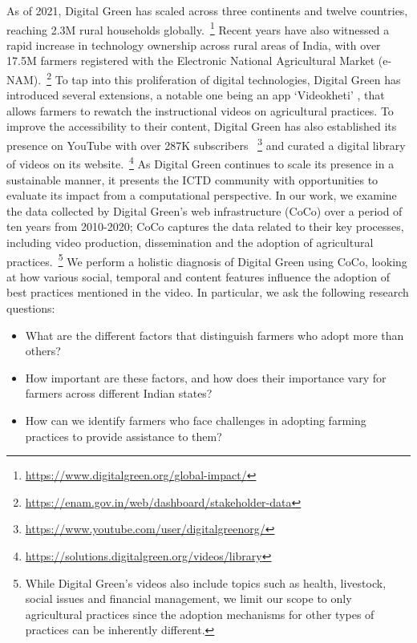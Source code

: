 \documentclass[manuscript,screen]{acmart}
\begin{document}
As of 2021, Digital Green has scaled across three continents and twelve countries, reaching 2.3M rural households globally.~\footnote{\url{https://www.digitalgreen.org/global-impact/}} Recent years have also witnessed a rapid increase in technology ownership across rural areas of India, with over 17.5M farmers registered with the Electronic National Agricultural Market (e-NAM).~\footnote{\url{https://enam.gov.in/web/dashboard/stakeholder-data}} To tap into this proliferation of digital technologies, Digital Green has introduced several extensions, a notable one being an app ‘Videokheti’ \cite{vkheti1, vkheti2}, that allows farmers to rewatch the instructional videos on agricultural practices. To improve the accessibility to their content, Digital Green has also established its presence on YouTube with over 287K subscribers ~\footnote{\url{https://www.youtube.com/user/digitalgreenorg/}} and curated a digital library of videos on its website.~\footnote{\url{https://solutions.digitalgreen.org/videos/library}} As Digital Green continues to scale its presence in a sustainable manner, it presents the ICTD community with opportunities to evaluate its impact from a computational perspective. In our work, we examine the data collected by Digital Green’s web infrastructure (CoCo) over a period of ten years from 2010-2020; CoCo captures the data related to their key processes, including video production, dissemination and the adoption of agricultural practices.~\footnote{While Digital Green’s videos also include topics such as health, livestock, social issues and financial management, we limit our scope to only agricultural practices since the adoption mechanisms for other types of practices can be inherently different.} We perform a holistic diagnosis of Digital Green using CoCo, looking at how various social, temporal and content features influence the adoption of best practices mentioned in the video. In particular, we ask the following research questions:

\begin{itemize}
    \item What are the different factors that distinguish farmers who adopt more than others?
    \item How important are these factors, and how does their importance vary for farmers across different Indian states?
    \item How can we identify farmers who face challenges in adopting farming practices to provide assistance to them?
\end{itemize}
\end{document}
